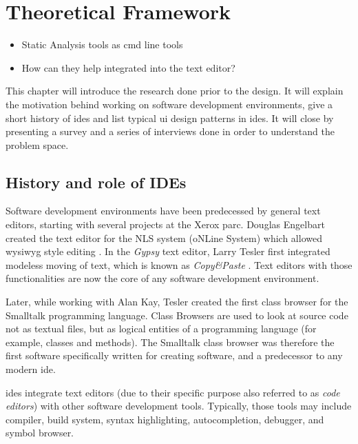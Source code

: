 \chapter{Theoretical Framework}\label{theoretical-framework}

\begin{itemize}
\itemsep1pt\parskip0pt
\item
  Static Analysis tools as cmd line tools
\item
  How can they help integrated into the text editor?
\end{itemize}

This chapter will introduce the research done prior to the design. It
will explain the motivation behind working on software development
environments, give a short history of \glspl{ide} and list typical
\gls{ui} design patterns in \glspl{ide}. It will close by presenting a
survey and a series of interviews done in order to understand the
problem space.

\section{History and role of IDEs}\label{history-and-role-of-ides}

Software development environments have been predecessed by general text
editors, starting with several projects at the Xerox \gls{parc}. Douglas
Engelbart created the text editor for the NLS system (oNLine System)
which allowed \gls{wysiwyg} style editing \cite[pp.]{moggridge}. In the
\emph{Gypsy} text editor, Larry Tesler first integrated modeless moving
of text, which is known as \emph{Copy\&Paste} \cite[pp.]{moggridge}.
Text editors with those functionalities are now the core of any software
development environment.

Later, while working with Alan Kay, Tesler created the first class
browser for the Smalltalk programming language. Class Browsers are used
to look at source code not as textual files, but as logical entities of
a programming language (for example, classes and methods). The Smalltalk
class browser was therefore the first software specifically written for
creating software, and a predecessor to any modern \gls{ide}.

\glspl{ide} integrate text editors (due to their specific purpose also
referred to as \emph{code editors}) with other software development
tools. Typically, those tools may include compiler, build system, syntax
highlighting, autocompletion, debugger, and symbol browser.

